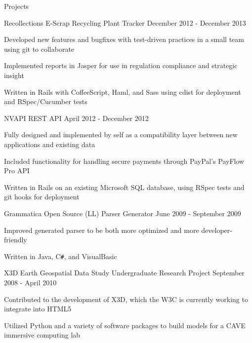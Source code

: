 \documentclass{resume}
\begin{document}
	\begin{section}{Projects}
		\begin{project}{Recollections}
		               {E-Scrap Recycling Plant Tracker}
		               {December 2012 - December 2013}
			\item Developed new features and bugfixes with test-driven practices in a
			      small team using git to collaborate
			\item Implemented reports in Jasper for use in regulation compliance and
			      strategic insight
			\item Written in Rails with CoffeeScript, Haml, and Sass using cdist for
			      deployment and RSpec/Cucumber tests
		\end{project}

		\begin{project}{NVAPI}
		               {REST API}
		               {April 2012 - December 2012}
			\item Fully designed and implemented by self as a compatibility layer
			      between new applications and existing data
			\item Included functionality for handling secure payments through
			      PayPal's PayFlow Pro API
			\item Written in Rails on an existing Microsoft SQL database, using RSpec
			      tests and git hooks for deployment
		\end{project}

		\begin{project}{Grammatica}
		               {Open Source (LL) Parser Generator}
		               {June 2009 - September 2009}
			\item Improved generated parser to be both more optimized and more
			      developer-friendly
			\item Written in Java, C\texttt{\#}, and VisualBasic
		\end{project}

		\begin{project}{X3D Earth Geospatial Data Study}
		               {Undergraduate Research Project}
		               {September 2008 - April 2010}
			\item Contributed to the development of X3D, which the W3C is currently
			      working to integrate into HTML5
			\item Utilized Python and a variety of software packages to build models
			      for a CAVE immersive computing lab
		\end{project}
	\end{section}
\end{document}
